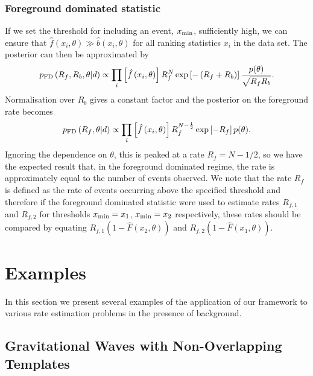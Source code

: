 \documentclass[aps,prd]{revtex4-1}
\begin{document}
\subsubsection{Foreground dominated statistic}
If we set the threshold for including an event, $x_{\rm min}$,
sufficiently high, we can ensure that $\hat{f}(x_i,\theta) \gg
\hat{b}(x_i,\theta)$ for all ranking statistics $x_i$ in the data
set. The posterior can then be approximated by
\begin{equation}
p_{\rm FD}\left( R_f, R_b, \theta | d \right) \propto \prod_{i} \left[
  \hat{f}\left(x_i, \theta\right)\right] R_f^N \exp\left[-\left( R_f +
  R_b \right) \right] \frac{p(\theta)}{\sqrt{R_f R_b}}.
\end{equation}
Normalisation over $R_b$ gives a constant factor and the posterior on
the foreground rate becomes
\begin{equation}
p_{\rm FD}\left( R_f, \theta | d \right) \propto \prod_{i} \left[
  \hat{f}\left(x_i, \theta\right)\right] R_f^{N-\frac{1}{2}}
\exp\left[-R_f \right] p(\theta).
\end{equation}
Ignoring the dependence on $\theta$, this is peaked at a rate $R_f =
N-1/2$, so we have the expected result that, in the foreground
dominated regime, the rate is approximately equal to the number of
events observed. We note that the rate $R_f$ is defined as the rate of
events occurring above the specified threshold and therefore if the
foreground dominated statistic were used to estimate rates $R_{f,1}$
and $R_{f,2}$ for thresholds $x_{\rm min}=x_1$, $x_{\rm min}=x_2$
respectively, these rates should be compared by equating $R_{f,1}
(1-\hat{F}(x_2,\theta))$ and $R_{f,2} (1-\hat{F}(x_1,\theta))$.

\section{Examples}
\label{sec:GW-example}

In this section we present several examples of the application of our
framework to various rate estimation problems in the presence of
background.

\subsection{Gravitational Waves with Non-Overlapping Templates}
\label{sec:analytic-GW-example}
\end{document}
